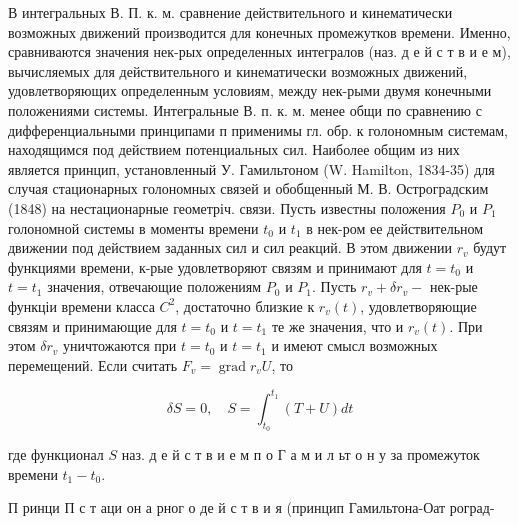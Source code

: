 \documentclass[10pt]{article}
\begin{document}
В интегральных В. П. к. м. сравнение действительного и кинематически возможных движений производится для конечных промежутков времени. Именно, сравниваются значения нек-рых определенных интегралов (наз. д е й с т в и е м), вычисляемых для действительного и кинематически возможных движений, удовлетворяющих определенным условиям, между нек-рыми двумя конечными положениями системы. Интегральные В. п. к. м. менее общи по сравнению с дифференциальными принципами п применимы гл. обр. к голономным системам, находящимся под действием потенциальных сил. Наиболее общим из них является принцип, установленный У. Гамильтоном (W. Hamilton, 1834-35) для случая стационарных голономных связей и обобщенный М. В. Остроградским (1848) на нестационарные геометріч. связи. Пусть известны положения $P_{0}$ и $P_{1}$ голономной системы в моменты времени $t_{0}$ и $t_{1}$ в нек-ром ее действительном движении под действием заданных сил и сил реакций. В этом движении $r_{v}$ будут функциями времени, к-рые удовлетворяют связям и принимают для $t=t_{0}$ и $t=t_{1}$ значения, отвечающие положениям $P_{0}$ и $P_{1}$. Пусть $r_{v}+\delta r_{v}-$ нек-рые функціи времени класса $C^{2}$, достаточно близкие к $r_{v}(t)$, удовлетворяющие связям и принимающие для $t=t_{0}$ и $t=t_{1}$ те же значения, что и $r_{v}(t)$. При этом $\delta r_{v}$ уничтожаются при $t=t_{0}$ и $t=t_{1}$ и имеют смысл возможных перемещений. Если считать $F_{v}=\operatorname{grad} r_{v} U$, то



\[

\delta S=0, \quad S=\int_{t_{0}}^{t_{1}}(T+U) d t

\]



где функционал $S$ наз. д е й с т в и е м п о $Г$ а м и л ьт о н у за промежуток времени $t_{1}-t_{0}$.



П ринци П с т аци он а рног о де й с т в и я (принцип Гамильтона-Оат роград-
\end{document}
